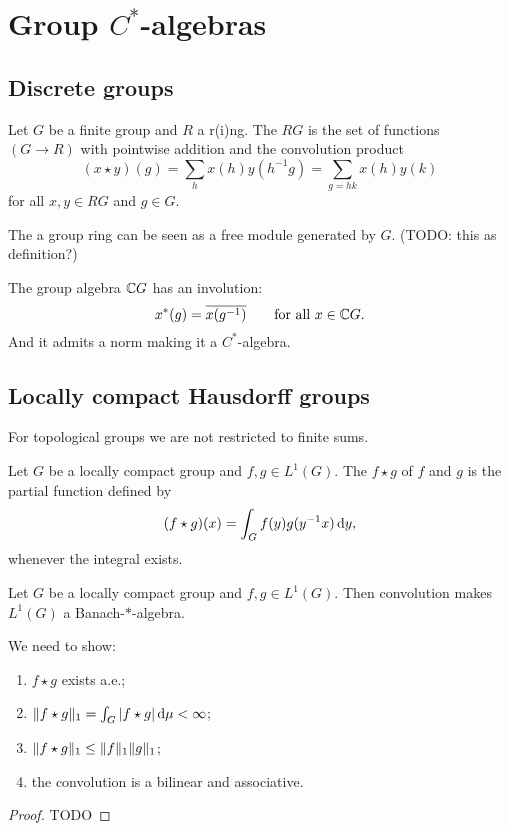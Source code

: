 \section{Group $C^*$-algebras}
\subsection{Discrete groups}
\begin{definition}
Let $G$ be a finite group and $R$ a r(i)ng. The  $RG$ is the set of functions $(G\to R)$ with pointwise addition and the convolution product
\[ (x\star y)(g) = \sum_h x(h)y(h^{-1}g) = \sum_{g=hk}x(h)y(k) \]
for all $x,y\in RG$ and $g\in G$. 
\end{definition}
The a group ring can be seen as a free module generated by $G$. (TODO: this as definition?)

The group algebra $\mathbb{C} G$ has an involution:
\[ x^*(g) = \overline{x(g^{-1})} \qquad \text{for all $x\in \mathbb{C} G$}. \]
And it admits a norm making it a $C^*$-algebra.

\subsection{Locally compact Hausdorff groups}
For topological groups we are not restricted to finite sums.

\begin{definition}
Let $G$ be a locally compact group and $f,g\in L^1(G)$. The  $f\star g$ of $f$ and $g$ is the partial function defined by
\[ (f\star g)(x) = \int_Gf(y)g(y^{-1}x)\operatorname{d \!}{y}, \]
whenever the integral exists.
\end{definition}

\begin{proposition}
Let $G$ be a locally compact group and $f,g\in L^1(G)$. Then convolution makes $L^1(G)$ a Banach-$*$-algebra.
\end{proposition}
We need to show:
\begin{enumerate}
\item $f\star g$ exists a.e.;
\item $\lVert f\star g\rVert_1 = \int_G |f\star g|\operatorname{d \!}{\mu}< \infty$;
\item $\lVert f \star g\rVert_1 \leq \lVert f\rVert_1\lVert g\rVert_1$;
\item the convolution is a bilinear and associative.
\end{enumerate}
\begin{proof}
TODO
\end{proof}

